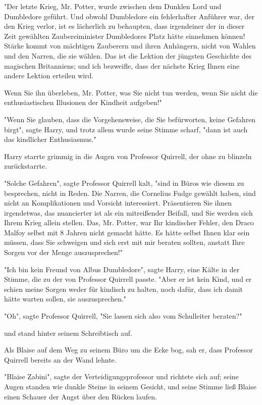 {"Der letzte Krieg, Mr. Potter, wurde zwischen dem Dunklen Lord und Dumbledore geführt. Und obwohl Dumbledore ein fehlerhafter Anführer war, der den Krieg verlor, ist es lächerlich zu behaupten, dass irgendeiner der in dieser Zeit gewählten Zaubereiminister Dumbledores Platz hätte einnehmen können! Stärke kommt von mächtigen Zauberern und ihren Anhängern, nicht von Wahlen und den Narren, die sie wählen. Das ist die Lektion der jüngsten Geschichte des magischen Britanniens; und ich bezweifle, dass der nächste Krieg Ihnen eine andere Lektion erteilen wird.

Wenn Sie ihn überleben, Mr. Potter, was Sie nicht tun werden, wenn Sie nicht die enthusiastischen Illusionen der Kindheit aufgeben!"

"Wenn Sie glauben, dass die Vorgehensweise, die Sie befürworten, keine Gefahren birgt", sagte Harry, und trotz allem wurde seine Stimme scharf, "dann ist auch das kindlicher Enthusiasmus."

Harry starrte grimmig in die Augen von Professor Quirrell, der ohne zu blinzeln zurückstarrte.

"Solche Gefahren", sagte Professor Quirrell kalt, "sind in Büros wie diesem zu besprechen, nicht in Reden. Die Narren, die Cornelius Fudge gewählt haben, sind nicht an Komplikationen und Vorsicht interessiert. Präsentieren Sie ihnen irgendetwas, das nuancierter ist als ein mitreißender Beifall, und Sie werden sich Ihrem Krieg allein stellen. Das, Mr. Potter, war Ihr kindischer Fehler, den Draco Malfoy selbst mit 8 Jahren nicht gemacht hätte. Es hätte selbst Ihnen klar sein müssen, dass Sie schweigen und sich erst mit mir beraten sollten, anstatt Ihre Sorgen vor der Menge auszusprechen!"

"Ich bin kein Freund von Albus Dumbledore", sagte Harry, eine Kälte in der Stimme, die zu der von Professor Quirrell passte. "Aber er ist kein Kind, und er schien meine Sorgen weder für kindisch zu halten, noch dafür, dass ich damit hätte warten sollen, sie auszusprechen."

"Oh", sagte Professor Quirrell, "Sie lassen sich also vom Schulleiter beraten?"

und stand hinter seinem Schreibtisch auf.

Als Blaise auf dem Weg zu seinem Büro um die Ecke bog, sah er, dass Professor Quirrell bereits an der Wand lehnte.

"Blaise Zabini", sagte der Verteidigungsprofessor und richtete sich auf; seine Augen standen wie dunkle Steine in seinem Gesicht, und seine Stimme ließ Blaise einen Schauer der Angst über den Rücken laufen.

}
